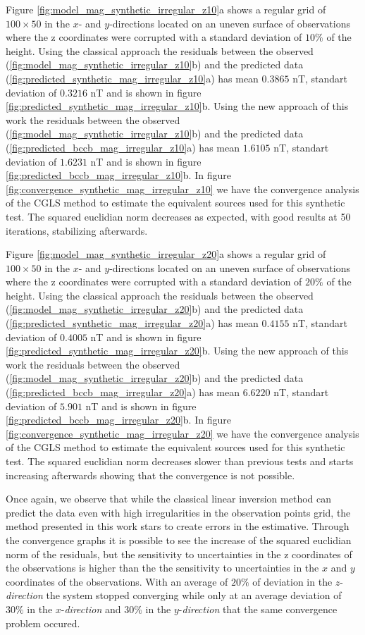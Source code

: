 Figure \ref{fig:model_mag_synthetic_irregular_z10}a shows  a regular grid of $100 \times 50$ in the $x$- and $y$-directions located on an uneven surface of observations where  the z coordinates were corrupted with a standard deviation of  $10\%$ of the height. Using the classical approach the residuals between the observed (\ref{fig:model_mag_synthetic_irregular_z10}b) and the predicted data (\ref{fig:predicted_synthetic_mag_irregular_z10}a) has mean $0.3865$ nT, standart deviation of $0.3216$ nT and is shown in figure \ref{fig:predicted_synthetic_mag_irregular_z10}b. Using the new approach of this work the residuals between the observed (\ref{fig:model_mag_synthetic_irregular_z10}b) and the predicted data (\ref{fig:predicted_bccb_mag_irregular_z10}a) has mean $1.6105$ nT, standart deviation of $1.6231$ nT and is shown in figure \ref{fig:predicted_bccb_mag_irregular_z10}b.
In figure \ref{fig:convergence_synthetic_mag_irregular_z10} we have the convergence analysis of the CGLS method to estimate the equivalent sources used for this synthetic test. The squared euclidian norm decreases as expected, with good results at 50 iterations, stabilizing afterwards.

Figure \ref{fig:model_mag_synthetic_irregular_z20}a shows  a regular grid of $100 \times 50$ in the $x$- and $y$-directions located on an uneven surface of observations where  the z coordinates were corrupted with a standard deviation of  $20\%$ of the height. Using the classical approach the residuals between the observed (\ref{fig:model_mag_synthetic_irregular_z20}b) and the predicted data (\ref{fig:predicted_synthetic_mag_irregular_z20}a) has mean $0.4155$ nT, standart deviation of $0.4005$ nT and is shown in figure \ref{fig:predicted_synthetic_mag_irregular_z20}b. Using the new approach of this work the residuals between the observed (\ref{fig:model_mag_synthetic_irregular_z20}b) and the predicted data (\ref{fig:predicted_bccb_mag_irregular_z20}a) has mean $6.6220$ nT, standart deviation of $5.901$ nT and is shown in figure \ref{fig:predicted_bccb_mag_irregular_z20}b.
In figure \ref{fig:convergence_synthetic_mag_irregular_z20} we have the convergence analysis of the CGLS method to estimate the equivalent sources used for this synthetic test. The squared euclidian norm decreases slower than previous tests and starts increasing afterwards showing that the convergence is not possible.

Once again, we observe that while the classical linear inversion method can predict the data even with high irregularities in the observation points grid, the method presented in this work stars to create errors in the estimative. Through the convergence graphs it is possible to see the increase of the squared euclidian norm of the residuals, but the sensitivity to uncertainties in the z coordinates of the observations is higher than the the sensitivity to uncertainties in the $x$ and $y$ coordinates of the observations. With an average of $20\%$ of deviation in the $z$-\textit{direction} the system stopped converging while only at an average deviation of $30\%$ in the $x$-\textit{direction} and $30\%$ in the $y$-\textit{direction} that the same convergence problem occured.